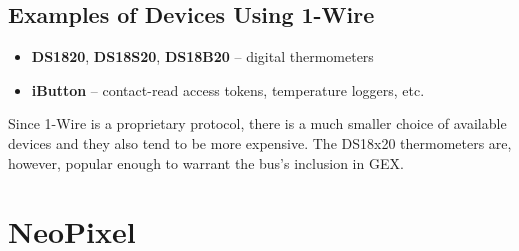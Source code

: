 \subsection{Examples of Devices Using 1-Wire}

\begin{itemize}
	\item \textbf{DS1820}, \textbf{DS18S20}, \textbf{DS18B20} -- digital thermometers
	\item \textbf{iButton} -- contact-read access tokens, temperature loggers, etc.
\end{itemize}

Since 1-Wire is a proprietary protocol, there is a much smaller choice of available devices and they also tend to be more expensive. The DS18x20 thermometers are, however, popular enough to warrant the bus's inclusion in GEX.

\section{NeoPixel} \label{sec:theory-neo}

